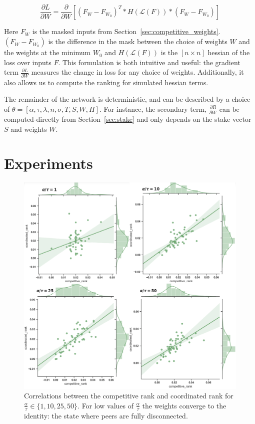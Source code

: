 \documentclass{article}
\begin{document}
\begin{equation}
\frac{\partial L}{\partial W} = \frac{\partial}{\partial W} [(F_W - F_{W_0})^T * H( \mathcal{L}(F)) * (F_W - F_{W_0})] 
\end{equation}
\smallskip

Here $F_W$ is the masked inputs from Section~\ref{sec:competitive_weights}. $(F_W - F_{W_0})$ is the difference in the mask between the choice of weights $W$ and the weights at the minimum $W_0$ and $H( \mathcal{L}(F))$ is the $[n \times n]$ hessian of the loss over inputs $F$. This formulation is both intuitive and useful: the gradient term $\frac{\partial L}{\partial W}$ measures the change in loss for any choice of weights. Additionally, it also allows us to compute the ranking for simulated hessian terms.
\smallskip

The remainder of the network is deterministic, and can be described by a choice of $\theta = [\alpha, \tau, \lambda, n, \sigma, T, S, W, H]$. For instance, the secondary term, $\frac{\partial R}{\partial W}$ can be computed-directly from Section~\ref{sec:stake} and only depends on the stake vector $S$ and weights $W$.
\smallskip

\section{Experiments}
\label{experiments}
\begin{figure}[!htb]
	\centering
	\includegraphics[scale=.34]{images/c_vs_c_nice.png}
	\caption{Correlations between the competitive rank and coordinated rank for $\frac{\alpha}{\tau} \in \{1, 10, 25, 50\}$. For low values of $\frac{\alpha}{\tau}$ the weights converge to the identity: the state where peers are fully disconnected. }
	\label{coordvscomp}
\end{figure}
\smallskip
\end{document}
